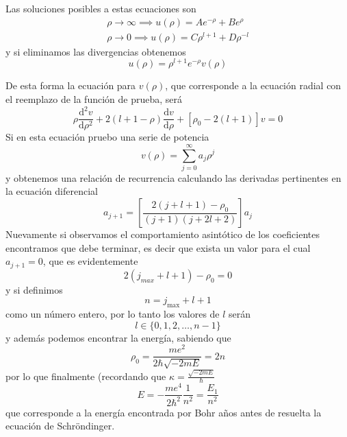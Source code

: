 \documentclass{book}
\numberwithin{equation}{section} %
\begin{document}
Las soluciones posibles a estas ecuaciones son
\begin{equation}
    \begin{gathered}
        \rho \to \infty  \implies u(\rho) = A e^{-\rho} + B e^{\rho} \\
        \rho \to 0 \implies u(\rho) = C \rho^{l + 1} + D \rho^{-l}
    \end{gathered}
\end{equation}
y si eliminamos las divergencias obtenemos
\begin{equation}
    u(\rho) = \rho^{l + 1} e^{-\rho} v(\rho)
\end{equation}

De esta forma la ecuación para $v(\rho)$, que corresponde a la ecuación radial con el reemplazo de la función de prueba, será
\begin{equation}
    \rho \frac{\mathrm{d}^2 v}{\mathrm{d}\rho^2} + 2(l + 1 - \rho) \frac{\mathrm{d} v}{\mathrm{d}\rho} + [\rho_0 - 2(l + 1)] v = 0
\end{equation}
Si en esta ecuación pruebo una serie de potencia
\begin{equation}
    v(\rho) = \sum_{j = 0}^\infty a_j \rho^j
\end{equation}
y obtenemos una relación de recurrencia calculando las derivadas pertinentes en la ecuación diferencial
\begin{equation}
    a_{j + 1} = \left[ \frac{ 2(j + l + 1) - \rho_0}{(j + 1) (j + 2l + 2)}\right] a_j
\end{equation}
Nuevamente si observamos el comportamiento asintótico de los coeficientes encontramos que debe terminar, es decir que exista un valor para el cual $a_{j + 1} = 0$, que es evidentemente
\begin{equation}
    2 (j_{max} + l + 1) - \rho_0 = 0
\end{equation}
y si definimos 
\begin{equation}
    n = j_{\max} + l + 1
\end{equation}
como un número entero, por lo tanto los valores de $l$ serán
\begin{equation}
    l \in \{0, 1, 2, \dots, n - 1\}
\end{equation}
y además podemos encontrar la energía, sabiendo que 
\[ \rho_0 = \frac{m e^2}{2 \hbar \sqrt{-2 m E}} = 2n\]
por lo que finalmente (recordando que $\kappa = \frac{\sqrt{-2 m E}}{\hbar}$
\begin{equation}
    E = - \frac{m e^4}{2 \hbar^2} \frac{1}{n^2} = \frac{E_1}{n^2}
\end{equation}
que corresponde a la energía encontrada por Bohr años antes de resuelta la ecuación de Schröndinger.
\end{document}
